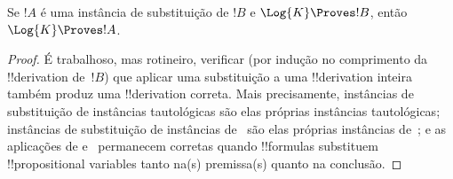 \documentclass[../../../include/open-logic-section]{subfiles}
\begin{document}
\begin{prop}
  Se $!A$ é uma instância de substituição de $!B$ e
  $\Log{K} \Proves !B$, então $\Log{K} \Proves !A$.
\end{prop}

\begin{proof}
  É trabalhoso, mas rotineiro, verificar (por indução no comprimento
  da !!{derivation} de~$!B$) que aplicar uma substituição a uma
  !!{derivation} inteira também produz uma !!{derivation} correta.
  Mais precisamente, instâncias de substituição de instâncias
  tautológicas são elas próprias instâncias tautológicas; instâncias
  de substituição de instâncias de~
  são elas próprias instâncias de~; e as aplicações de \MP{} e~\Nec{} permanecem corretas
  quando !!{formula}s substituem !!{propositional variable}s tanto
  na(s) premissa(s) quanto na conclusão.
\end{proof}
\end{document}
